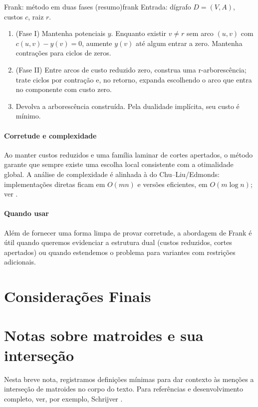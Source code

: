 \documentclass[12pt,a4paper]{article}
\begin{document}
\begin{algobox}{Frank: método em duas fases (resumo)}{frank}
Entrada: dígrafo \(D=(V,A)\), custos \(c\), raiz \(r\).
\begin{enumerate}\setlength{\itemsep}{2pt}
    \item (Fase I) Mantenha potenciais \(y\). Enquanto existir \(v\neq r\) sem arco \((u,v)\) com \(c(u,v)-y(v)=0\), aumente \(y(v)\) até algum entrar a zero. Mantenha contrações para ciclos de zeros.
    \item (Fase II) Entre arcos de custo reduzido zero, construa uma r-arborescência; trate ciclos por contração e, no retorno, expanda escolhendo o arco que entra no componente com custo zero.
    \item Devolva a arborescência construída. Pela dualidade implícita, seu custo é mínimo.
\end{enumerate}
\end{algobox}

\paragraph{Corretude e complexidade}
Ao manter custos reduzidos e uma família laminar de cortes apertados, o método garante que sempre existe uma escolha local consistente com a otimalidade global. A análise de complexidade é alinhada à do Chu–Liu/Edmonds: implementações diretas ficam em \(O(mn)\) e versões eficientes, em \(O(m\log n)\); ver \cite{frank2014,schrijver2003comb}.

\paragraph{Quando usar}
Além de fornecer uma forma limpa de provar corretude, a abordagem de Frank é útil quando queremos evidenciar a estrutura dual (custos reduzidos, cortes apertados) ou quando estendemos o problema para variantes com restrições adicionais.
    
\section{Considerações Finais}
\clearpage
\appendix

\section{Notas sobre matroides e sua interseção}
\label{ap:matroides}
Nesta breve nota, registramos definições mínimas para dar contexto às menções a interseção de matroides no corpo do texto. Para referências e desenvolvimento completo, ver, por exemplo, Schrijver \cite{schrijver2003comb}.
\end{document}
